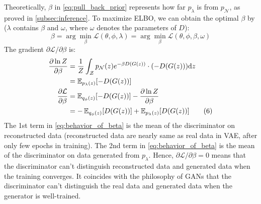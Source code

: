 Theoretically, $\beta$ in \cref{eq:pull_back_prior} represents how far $p_\lambda$ is from $p_\mathcal{N}$, as proved in \cref{subsec:inference}.
To maximize ELBO, we can obtain the optimal $\beta$ by ($\lambda$ contains $\beta$ and $\omega$, where $\omega$ denotes the parameters of $D$):
\begin{equation}
	\beta = \arg \min_{\beta} \mathcal{L}(\theta, \phi, \lambda) = \arg \min_{\beta} \mathcal{L}(\theta, \phi, \beta, \omega) \tag{5}
\end{equation}
The gradient $\partial \mathcal{L}/\partial \beta$ is:
\begin{align*}\label{eq:behavior_of_beta}
\frac{\partial \ln Z}{\partial \beta} &= \frac{1}{Z} \int_{\mathcal{Z}} p_\mathcal{N}(z) e^{-\beta D(G(z))} \cdot (-D(G(z))) \mathrm{d} z \\
&=  \operatorname{\mathbb{E}}_{p_\lambda(z)} [- D(G(z))]  \\
\frac{\partial \mathcal{L}}{\partial \beta} &= \operatorname{\mathbb{E}}_{q_\phi(z)}[ -D(G(z))] - \frac{\partial \ln Z}{\partial \beta} \\
&= - \operatorname{\mathbb{E}}_{q_\phi(z)}[ D(G(z))] + \operatorname{\mathbb{E}}_{p_\lambda(z)}[ D(G(z))]   \tag{6}
\end{align*}
The 1st term in \cref{eq:behavior_of_beta} is the mean of the discriminator on reconstructed data (reconstructed data are nearly same as real data in VAE, after only few epochs in training). 
The 2nd term in \cref{eq:behavior_of_beta} is the mean of the discriminator on data generated from $p_\lambda$. 
Hence, $\partial \mathcal{L}/\partial \beta = 0$ means that the discriminator can't distinguish reconstructed data and generated data when the training converges. It coincides with the philosophy of GANs that the discriminator can't distinguish the real data and generated data when the generator is well-trained.	

